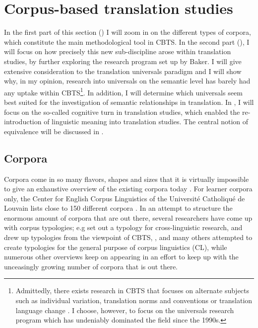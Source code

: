 \section{Corpus-based translation studies}
\label{sec:2.2}
In the first part of this section () I will zoom in on the different types of corpora, which constitute the main methodological tool in CBTS. In the second part (), I will focus on how precisely this new sub-discipline arose within translation studies, by further exploring the research program set up by Baker. I will give extensive consideration to the translation universals paradigm and I will show why, in my opinion, research into universals on the semantic level has barely had any uptake within CBTS\footnote{Admittedly, there exists research in CBTS that focuses on alternate subjects such as individual variation, translation norms and conventions or translation language change \citep[21]{zanettin_corpus_2013}. I choose, however, to focus on the universals research program which has undeniably dominated the field since the 1990s.}. In addition, I will determine which universals seem best suited for the investigation of semantic relationships in translation. In , I will focus on the so-called cognitive turn in translation studies, which enabled the re-introduction of linguistic meaning into translation studies. The central notion of equivalence will be discussed in .\hypertarget{Corpora}{}

\subsection{Corpora}
\label{sec:2.2.1}  
Corpora come in so many flavors, shapes and sizes that it is virtually impossible to give an exhaustive overview of the existing corpora today \citep{mcenery_corpus_2012}. For learner corpora only, the Center for English Corpus Linguistics of the Université Catholiqué de Louvain lists close to 150 different corpora \citep{hiligsmann_learner_2015}. In an attempt to structure the enormous amount of corpora that are out there, several researchers have come up with corpus typologies; e.g \citet{johansson_role_1998} set out a typology for cross-linguistic research, \citet{baker_corpora_1995} and \citet{laviosa_corpus-based_2002} drew up typologies from the viewpoint of CBTS, \citet{brown_corpora_2006}, \citet{mccarthy_what_2010} and many others attempted to create typologies for the general purpose of corpus linguistics (CL), while numerous other overviews keep on appearing in an effort to keep up with the unceasingly growing number of corpora that is out there.

